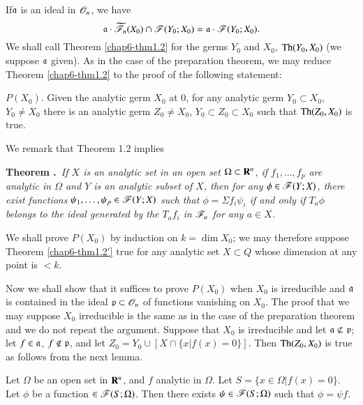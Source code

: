 \begin{theorem}\label{chap6-thm1.2}
If\pageoriginale $\mathfrak{a}$ is an ideal in $\mathscr{O}_{n}$, we have
$$
\mathfrak{a}\cdot \widetilde{\mathscr{F}}_{n}(X_{0})\cap \mathscr{F}(Y_{0};X_{0})=\mathfrak{a}\cdot \mathscr{F}(Y_{0};X_{0}).
$$
We shall call Theorem \ref{chap6-thm1.2} for the germs $Y_{0}$ and $X_{0}$, $\operatorname{Th}(Y_{0},X_{0})$ (we suppose $\mathfrak{a}$ given). As in the case of the preparation theorem, we may reduce Theorem \ref{chap6-thm1.2} to the proof of the following statement:

$P(X_{0})$. Given the analytic germ $X_{0}$ at $0$, for any analytic germ $Y_{0}\subset X_{0}$, $Y_{0}\neq X_{0}$ there is an analytic germ $Z_{0}\neq X_{0}$, $Y_{0}\subset Z_{0}\subset X_{0}$ such that $\operatorname{Th}(Z_{0},X_{0})$ is true.
\end{theorem}

We remark that Theorem 1.2 implies

\medskip
\noindent
{\bf Theorem .\label{chap6-thm1.2'}}~{\em If $X$ is an analytic set in an open set $\Omega\subset \mathbf{R}^{n}$, if $f_{1},\ldots,f_{p}$ are analytic in $\Omega$ and $Y$ is an analytic subset of $X$, then for any $\phi\in \mathscr{F}(Y;X)$, there exist functions $\psi_{1},\ldots,\psi_{p}\in \mathscr{F}(Y;X)$ such that $\phi=\Sigma f_{i}\psi_{i}$ if and only if $T_{a}\phi$ belongs to the ideal generated by the $T_{a}f_{i}$ in $\mathscr{F}_{a}$ for any $a\in X$.}
\smallskip

We shall prove $P(X_{0})$ by induction on $k=\dim X_{0}$; we may therefore suppose Theorem \ref{chap6-thm1.2'} true for any analytic set $X\subset Q$ whose dimension at any point is $<k$.

Now we shall show that it suffices to prove $P(X_{0})$ when $X_{0}$ is irreducible and $\mathfrak{a}$ is contained in the ideal $\mathfrak{p}\subset\mathscr{O}_{n}$ of functions vanishing on $X_{0}$. The proof that we may suppose $X_{0}$ irreducible is the same as in the case of the preparation theorem and we do not repeat the argument. Suppose that $X_{0}$ is irreducible and let $\fraka\nsubset \frakp$; let $f\in \mathfrak{a}$, $f\not\in \mathfrak{p}$, and let $Z_{0}=Y_{0}\cup [X\cap \{x|f(x)=0\}]$. Then $\operatorname{Th}(Z_{0},X_{0})$ is true as follows from the next lemma.

\begin{lemma}\label{chap6-lem1.3}
Let $\Omega$ be an open set in $\mathbf{R}^{n}$, and $f$ analytic in $\Omega$. Let $S=\{x\in\Omega|f(x)=0\}$. Let $\phi$ be a function $\in\mathscr{F}(S;\Omega)$. Then there exists $\psi\in \mathscr{F}(S;\Omega)$ such that $\phi=\psi f$.
\end{lemma}

